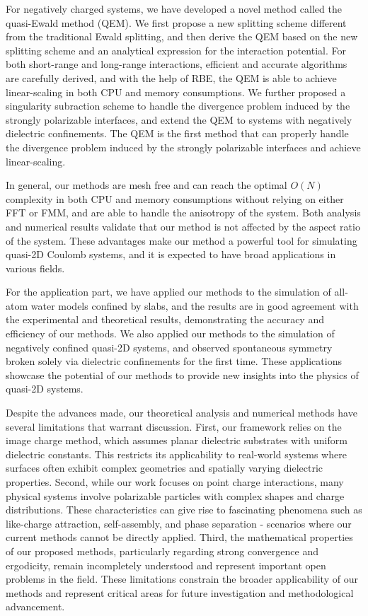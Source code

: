 For negatively charged systems, we have developed a novel method called the quasi-Ewald method (QEM).
We first propose a new splitting scheme different from the traditional Ewald splitting, and then derive the QEM based on the new splitting scheme and an analytical expression for the interaction potential.
For both short-range and long-range interactions, efficient and accurate algorithms are carefully derived, and with the help of RBE, the QEM is able to achieve linear-scaling in both CPU and memory consumptions.
We further proposed a singularity subraction scheme to handle the divergence problem induced by the strongly polarizable interfaces, and extend the QEM to systems with negatively dielectric confinements.
The QEM is the first method that can properly handle the divergence problem induced by the strongly polarizable interfaces and achieve linear-scaling.


In general, our methods are mesh free and can reach the optimal $O(N)$ complexity in both CPU and memory consumptions without relying on either FFT or FMM, and are able to handle the anisotropy of the system.
Both analysis and numerical results validate that our method is not affected by the aspect ratio of the system.
These advantages make our method a powerful tool for simulating quasi-2D Coulomb systems, and it is expected to have broad applications in various fields.

For the application part, we have applied our methods to the simulation of all-atom water models confined by slabs, and the results are in good agreement with the experimental and theoretical results, demonstrating the accuracy and efficiency of our methods.
We also applied our methods to the simulation of negatively confined quasi-2D systems, and observed spontaneous symmetry broken solely via dielectric confinements for the first time.
These applications showcase the potential of our methods to provide new insights into the physics of quasi-2D systems.

Despite the advances made, our theoretical analysis and numerical methods have several limitations that warrant discussion.
First, our framework relies on the image charge method, which assumes planar dielectric substrates with uniform dielectric constants.
This restricts its applicability to real-world systems where surfaces often exhibit complex geometries and spatially varying dielectric properties.
Second, while our work focuses on point charge interactions, many physical systems involve polarizable particles with complex shapes and charge distributions.
These characteristics can give rise to fascinating phenomena such as like-charge attraction, self-assembly, and phase separation - scenarios where our current methods cannot be directly applied.
Third, the mathematical properties of our proposed methods, particularly regarding strong convergence and ergodicity, remain incompletely understood and represent important open problems in the field.
These limitations constrain the broader applicability of our methods and represent critical areas for future investigation and methodological advancement.


